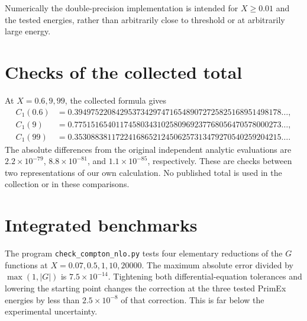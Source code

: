 Numerically the double-precision implementation is intended for
$X\geq0.01$ and the tested energies, rather than arbitrarily close
to threshold or at arbitrarily large energy.

\section{Checks of the collected total}
At $X=0.6,9,99$, the collected formula gives
\begin{align}
C_1(0.6)&=0.39497522084295373429747165489072725825168951498178\ldots,\\
C_1(9)&=0.77515165401174580343102580969237768056470578000273\ldots,\\
C_1(99)&=0.35308838117224168652124506257313479270540259204215\ldots.
\end{align}
The absolute differences from the original independent analytic evaluations are $2.2\times10^{-79}$, $8.8\times10^{-81}$, and $1.1\times10^{-85}$, respectively. These are checks between two representations of our own calculation. No published total is used in the collection or in these comparisons.



\section{Integrated benchmarks}
The program \texttt{check\_compton\_nlo.py} tests four elementary
reductions of the $G$ functions at $X=0.07,0.5,1,10,20000$.
The maximum absolute error divided by $\max(1,|G|)$ is
$7.5\times10^{-14}$. Tightening both differential-equation
tolerances and lowering the starting point changes the correction
at the three tested PrimEx energies by less than $2.5\times10^{-8}$
of that correction. This is far below the experimental uncertainty.

